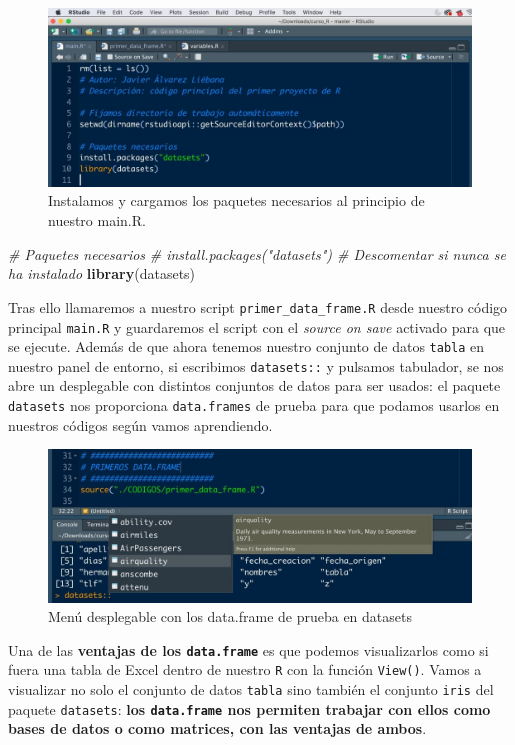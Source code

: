 \documentclass[11pt,]{book}
\newenvironment{Shaded}{\begin{snugshade}}{\end{snugshade}}
\newcommand{\CommentTok}[1]{\textcolor[rgb]{0.37,0.37,0.37}{\textit{#1}}}
\newcommand{\KeywordTok}[1]{\textcolor[rgb]{0.27,0.27,0.27}{\textbf{#1}}}
\newcommand{\NormalTok}[1]{#1}
\begin{document}
\begin{figure}

{\centering \includegraphics[width=0.5\linewidth]{./img/carga_paquetes_inicial} 

}

\caption{Instalamos y cargamos los paquetes necesarios al principio de nuestro main.R.}\label{fig:carga-paquetes-inicial}
\end{figure}

\begin{Shaded}
\begin{Highlighting}[]
\CommentTok{# Paquetes necesarios}
\CommentTok{# install.packages("datasets") # Descomentar si nunca se ha instalado}
\KeywordTok{library}\NormalTok{(datasets)}
\end{Highlighting}
\end{Shaded}

Tras ello llamaremos a nuestro script \texttt{primer\_data\_frame.R} desde nuestro código principal \texttt{main.R} y guardaremos el script con el \emph{source on save} activado para que se ejecute. Además de que ahora tenemos nuestro conjunto de datos \texttt{tabla} en nuestro panel de entorno, si escribimos \texttt{datasets::} y pulsamos tabulador, se nos abre un desplegable con distintos conjuntos de datos para ser usados: el paquete \texttt{datasets} nos proporciona \texttt{data.frames} de prueba para que podamos usarlos en nuestros códigos según vamos aprendiendo.

\begin{figure}

{\centering \includegraphics[width=0.5\linewidth]{./img/datasets} 

}

\caption{Menú desplegable con los data.frame de prueba en datasets}\label{fig:datasets}
\end{figure}

Una de las \textbf{ventajas de los \texttt{data.frame}} es que podemos visualizarlos como si fuera una tabla de Excel dentro de nuestro \texttt{R} con la función \texttt{View()}. Vamos a visualizar no solo el conjunto de datos \texttt{tabla} sino también el conjunto \texttt{iris} del paquete \texttt{datasets}: \textbf{los \texttt{data.frame} nos permiten trabajar con ellos como bases de datos o como matrices, con las ventajas de ambos}.
\end{document}
